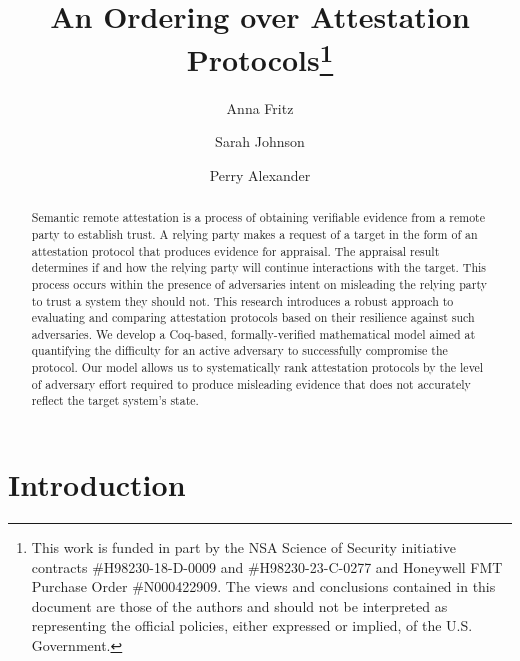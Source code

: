 \documentclass[runningheads]{llncs}
\theoremstyle{definition}
\begin{document}
%
\title{An Ordering over Attestation Protocols\thanks{This work is
    funded in part by the NSA Science of Security initiative contracts
    \#H98230-18-D-0009 and \#H98230-23-C-0277 and Honeywell FMT Purchase Order
    \#N000422909. The views and conclusions contained in this document
    are those of the authors and should not be interpreted as
    representing the official policies, either expressed or implied,
    of the U.S. Government.}
}
%
%
\author{Anna Fritz \and
Sarah Johnson \and
Perry Alexander}
%
%
%
\maketitle              %
%
\begin{abstract}
Semantic remote attestation is a process of obtaining verifiable
evidence from a remote party to establish trust. A relying party makes
a request of a target in the form of an attestation protocol that
produces evidence for appraisal. The appraisal result determines if
and how the relying party will continue interactions with the
target. This process occurs within the presence of adversaries intent
on misleading the relying party to trust a system they should
not. This research introduces a robust approach to evaluating and
comparing attestation protocols based on their resilience against such
adversaries. We develop a Coq-based, formally-verified mathematical
model aimed at quantifying the difficulty for an active adversary to
successfully compromise the protocol. Our model allows us to
systematically rank attestation protocols by the level of adversary
effort required to produce misleading evidence that does not
accurately reflect the target system's state. 

\end{abstract}
%
%
%
\section{Introduction}
\end{document}
